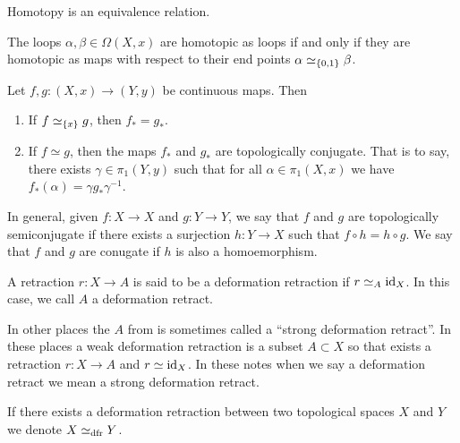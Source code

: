 \documentclass[11pt,a4paper]{article}
\begin{document}
\begin{exercise}
  Homotopy is an equivalence relation.
\end{exercise}

\begin{remark}
  The loops $\alpha, \beta \in \Omega(X,x)$ are homotopic as loops
  if and only if they are homotopic as maps with respect to
  their end points $\alpha \simeq_{\left\{0,1\right\}} \beta$.
\end{remark}

\begin{proposition}
  Let $f,g \colon (X,x) \to (Y,y)$ be continuous maps.
  Then
  \begin{enumerate}
    \item[(1)] If $f \simeq_{\left\{x\right\}} g$, then $f_* = g_*$.
    \item[(2)] If $f \simeq g$, then the maps $f_*$ and $g_*$ are
      topologically conjugate. That is to say, there exists 
      $\gamma \in \pi_1(Y,y)$ such that for all $\alpha \in \pi_1(X,x)$
      we have $f_*(\alpha) = \gamma g_* \gamma^{-1}$.
  \end{enumerate}
\end{proposition}

\begin{remark}
  In general, given $f \colon X \to X$ and $g \colon Y \to Y$,
  we say that $f$ and $g$ are topologically semiconjugate if there
  exists a surjection $h \colon Y \to X$ such that
  $f \circ h = h \circ g$.
  We say that $f$ and $g$ are conugate if $h$ is also a homoemorphism.
\end{remark}

\begin{definition}
  \label{def:deformation-retract}
  A retraction $r \colon X \to A$ is said to be a deformation retraction
  if $r \simeq_{A} \operatorname{id}_X$.
  In this case, we call $A$ a deformation retract.
\end{definition}

\begin{remark}
  In other places the $A$ from 
  is sometimes called a ``strong deformation retract''.
  In these places a weak deformation retraction is a subset $A \subset X$
  so that exists a retraction $r \colon X \to A$ and $r \simeq \operatorname{id}_X$.
  In these notes when we say a deformation retract we mean
  a strong deformation retract.
\end{remark}

\begin{remark}
  If there exists a deformation retraction between two topological spaces
  $X$ and $Y$ we denote $X \simeq_{\operatorname{dfr}} Y$.
\end{remark}
\end{document}
